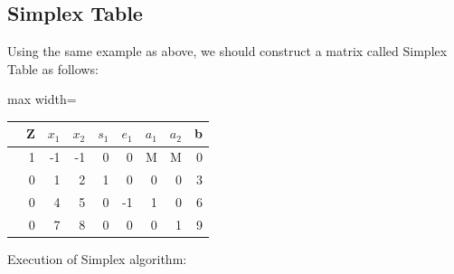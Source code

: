 \documentclass[12pt,a4paper]{article}
\begin{document}
\subsection*{Simplex Table}
Using the same example as above, we should construct a matrix called Simplex Table as follows:
\begin{table}[H]
\centering
\begin{adjustbox}{max width=\textwidth}
\begin{tabular}{c|rrrrrrrr}
& Z & $x_1$& $x_2$& $s_1$& $e_1$& $a_1$& $a_2$& b\\ \hline
& 1& -1& -1& 0& 0& M& M& 0\\
& 0& 1& 2& 1& 0& 0& 0& 3\\
& 0& 4& 5& 0& -1& 1& 0& 6\\
& 0& 7& 8& 0& 0& 0& 1& 9\\
\end{tabular}
\end{adjustbox}
\end{table}
\newpage
Execution of Simplex algorithm:
\end{document}
